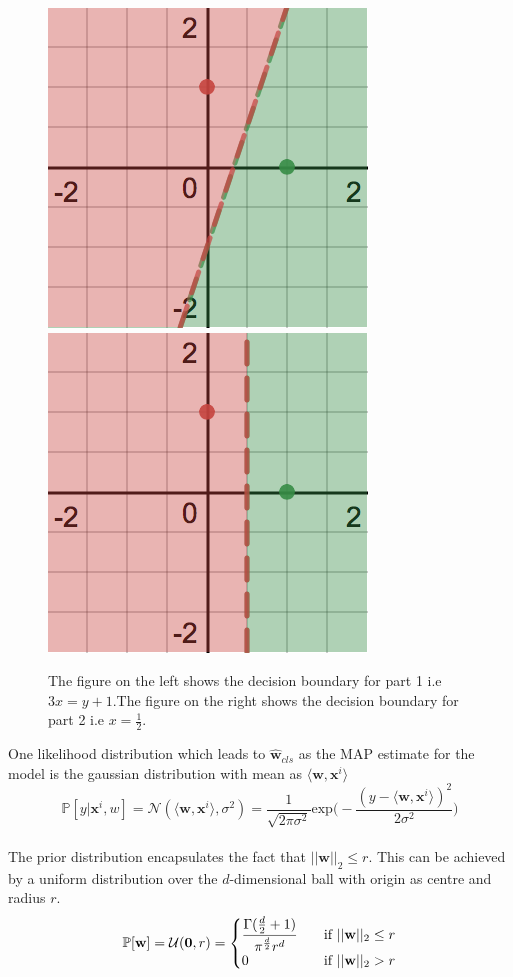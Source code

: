 \documentclass[a4paper,11pt]{article}
\begin{document}
\begin{mlsolution}
\begin{figure}[th]%
\centering
\includegraphics[width=0.3\columnwidth]{q1_graph1.png}%
\hfill
\includegraphics[width=0.3\columnwidth]{q1_graph2.png}%
\caption{The figure on the left shows the decision boundary for part 1 i.e $3x = y+ 1.$\newline The figure on the right shows the decision boundary for part 2 i.e $x = \frac{1}{2}$.}%
\label{fig:proto}%
\end{figure}

\end{mlsolution}

\begin{mlsolution}
One likelihood distribution which leads to $\mathbf{\hat{w}}_{cls}$ as the MAP estimate for the model is the gaussian distribution with mean as $\langle \mathbf{w,x}^i \rangle$ \[
\mathbb{P}[y|\mathbf{x}^i,w] = \mathcal{N}(\langle \mathbf{w,x}^i \rangle,\sigma^2) = \frac{1}{\sqrt{2\pi\sigma^2}} \text{exp}\bigg(-\frac{(y-\langle \mathbf{w,x}^i \rangle)^2}{2\sigma^2}\bigg)
\]
\\The prior distribution encapsulates the fact that $||\mathbf{w}||_2 \leq r$. This can be achieved by a uniform distribution over the $d$-dimensional ball with origin as centre and radius $r$.\[
\mathbb{P}[\mathbf{w}] = \mathcal{U}(\mathbf{0},r) = 
     \begin{cases}
       \cfrac{\Gamma(\frac{d}{2} + 1)}{\pi^{\frac{d}{2}} r^d} &\quad\text{if }||\mathbf{w}||_2 \leq r\\
       0 &\quad\text{if }||\mathbf{w}||_2 > r\\
     \end{cases}
\]

\end{mlsolution}
\end{document}
